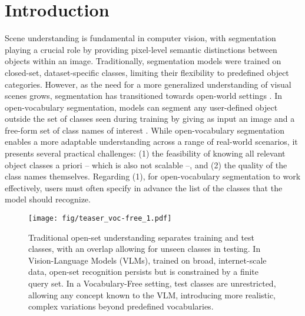 \section{Introduction}
\label{sec:intro}

Scene understanding is fundamental in computer vision, with segmentation playing a crucial role by providing pixel-level semantic distinctions between objects within an image. Traditionally, segmentation models were trained on closed-set, dataset-specific classes, limiting their flexibility to predefined object categories. However, as the need for a more generalized understanding of visual scenes grows, segmentation has transitioned towards open-world settings \cite{pham2018bayesian,cen2021deep}.
In open-vocabulary segmentation, models can segment any user-defined object outside the set of classes seen during training by giving as input an image and a free-form set of class names of interest \cite{xu2023side,cho2024cat}.
While open-vocabulary segmentation enables a more adaptable understanding across a range of real-world scenarios, it presents several practical challenges: %
(1) the feasibility of knowing all relevant object classes a priori -- which is also not scalable --, and (2) the quality of the class names themselves. 
Regarding (1), for open-vocabulary segmentation to work effectively, users must often specify in advance the list of the classes that the model should recognize. 
\begin{figure}[t]
    \centering
    \texttt{[image: fig/teaser\_voc-free\_1.pdf]}
    \caption{Traditional open-set understanding separates training and test classes, with an overlap allowing for unseen classes in testing.  In Vision-Language Models (VLMs), trained on broad, internet-scale data, open-set recognition persists but is constrained by a finite query set. In a Vocabulary-Free setting, test classes are unrestricted, allowing any concept known to the VLM, introducing more realistic, complex variations beyond predefined vocabularies.
    }
    \label{fig:teaser}
\end{figure}

        

